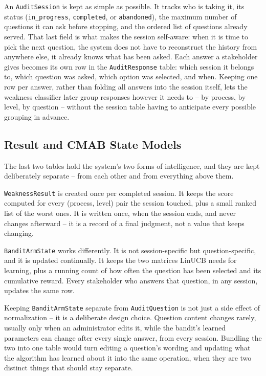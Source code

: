 \documentclass[a4paper, 12pt, oneside, openany, BCOR1cm,toc=chapterentrywithdots]{scrbook}
\begin{document}
An \texttt{AuditSession} is kept as simple as possible. It tracks who is taking it, its status
(\texttt{in\_progress}, \texttt{completed}, or \texttt{abandoned}), the maximum number of
questions it can ask before stopping, and the ordered list of questions already served. That last
field is what makes the session self-aware: when it is time to pick the next question, the
system does not have to reconstruct the history from anywhere else, it already knows what has
been asked. Each answer a stakeholder gives becomes its own row in the \texttt{AuditResponse}
table: which session it belongs to, which question was asked, which option was selected, and
when. Keeping one row per answer, rather than folding all answers into the session itself, lets
the weakness classifier later group responses however it needs to -- by process, by level, by
question -- without the session table having to anticipate every possible grouping in advance.

\subsection{Result and CMAB State Models}
\label{sec:result-cmab-models}

The last two tables hold the system's two forms of intelligence, and they are kept deliberately
separate -- from each other and from everything above them.

\texttt{WeaknessResult} is created once per completed session. It keeps the score computed for
every (process, level) pair the session touched, plus a small ranked list of the worst ones. It
is written once, when the session ends, and never changes afterward -- it is a record of a final
judgment, not a value that keeps changing.

\texttt{BanditArmState} works differently. It is not session-specific but question-specific, and
it is updated continually. It keeps the two matrices LinUCB needs for learning, plus a running
count of how often the question has been selected and its cumulative reward. Every stakeholder
who answers that question, in any session, updates the same row.

Keeping \texttt{BanditArmState} separate from \texttt{AuditQuestion} is not just a side effect of
normalization -- it is a deliberate design choice. Question content changes rarely, usually only
when an administrator edits it, while the bandit's learned parameters can change after every
single answer, from every session. Bundling the two into one table would turn editing a
question's wording and updating what the algorithm has learned about it into the same operation,
when they are two distinct things that should stay separate.
\end{document}
